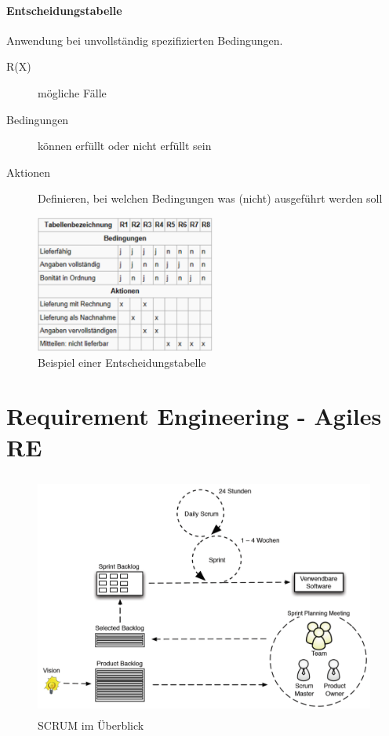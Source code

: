 \documentclass[a4paper]{article}
\begin{document}
					\paragraph{Entscheidungstabelle} 
					
					Anwendung bei unvollständig spezifizierten Bedingungen.
					
					\begin{description}
						\item[R(X)] mögliche Fälle
						\item[Bedingungen] können erfüllt oder nicht erfüllt sein
						\item[Aktionen] Definieren, bei welchen Bedingungen was (nicht) ausgeführt werden soll
					\end{description}
				
					\begin{figure}[!htb]
						\centering
						\includegraphics[height=4.5cm]{img/re/03/entscheidungstabelle.png}
						\caption{Beispiel einer Entscheidungstabelle}
						\label{fig:re_entscheidungstabelle}
					\end{figure}
	
\newpage

	\section{Requirement Engineering - Agiles RE}
	
	\begin{figure}[!htb]
		\centering
		\includegraphics[height=8cm]{img/re/05/scrum_overview.png}
		\caption{SCRUM im Überblick}
		\label{fig:re_scrum_overview}
	\end{figure}
\end{document}
